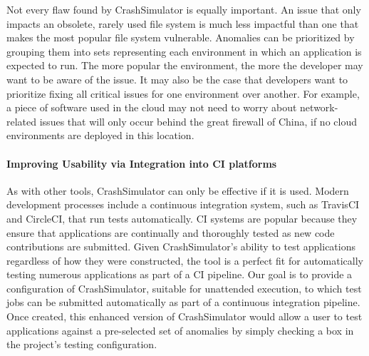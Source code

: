 Not every flaw found by CrashSimulator is equally important.  An issue that only
impacts an obsolete, rarely used file system is much less impactful than
one that makes the most popular file system vulnerable.
Anomalies
can be prioritized by grouping them into sets representing each
environment in which an application is expected to run. The more popular
the environment, the more the developer may want to be aware of the issue.
It may also be the case that developers want to prioritize fixing all
critical issues for one environment over another.  For example, a piece
of software used in the cloud may not need to worry about 
network-related issues that will only
occur behind the great firewall of China, if no cloud environments are deployed in this location.


%
%

\paragraph{Improving Usability via Integration into CI platforms}

As with other tools, CrashSimulator can only be effective if it is used.
Modern development processes include a continuous integration system,
such as TravisCI
and CircleCI, that run tests automatically.
CI systems are popular because they
ensure that applications are continually and thoroughly tested as new code
contributions are submitted.  Given CrashSimulator's ability to test
applications regardless of how they were constructed,
the tool is a perfect fit for
automatically testing numerous applications as part of a CI pipeline.
Our goal is to provide a configuration of CrashSimulator,
suitable for unattended execution, to which test jobs can be submitted
automatically as part of a continuous integration pipeline.  Once created,
this enhanced version of CrashSimulator would allow a user to test
applications against
a pre-selected set of anomalies by simply checking a box in the project's
testing configuration.

